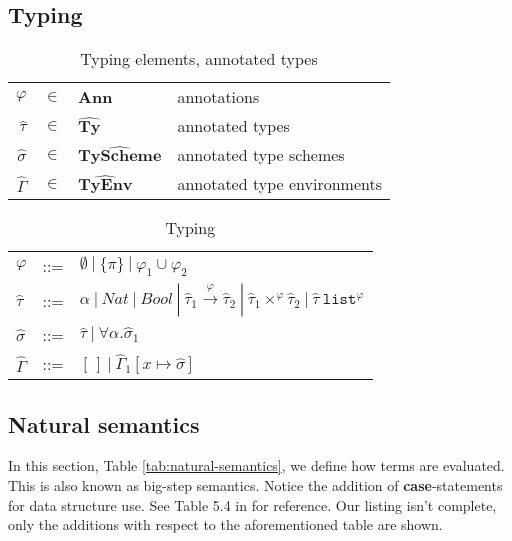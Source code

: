 \documentclass[a4paper]{article}
\begin{document}
\subsection{Typing}

\begin{table}
    \centering
    \begin{tabular}{rcll}
        $\varphi$ &               $\in$ & \textbf{Ann}                   & annotations \\ 
        $\widehat{\tau}$&         $\in$ & $\widehat{\textbf{Ty}      } $ & annotated types \\
        $\widehat{\sigma} $&      $\in$ & $\widehat{\textbf{TyScheme}} $ & annotated type schemes\\
        $\widehat{\Gamma}$&       $\in$ & $\widehat{\textbf{TyEnv}   } $ & annotated type environments  \\
    \end{tabular}
    \caption{Typing elements, annotated types}
    \label{tab:typingelems}
\end{table}
\begin{table}
    \centering
    \begin{tabular}{lcl}
        $ \varphi$         & ::= & $ \emptyset \:|\: \{\pi\} \:|\: \varphi_1 \cup \varphi_2 $ \\
        $\widehat{\tau}$   & ::= & $\alpha \:|\: Nat \: | \: Bool \: | \: \widehat{\tau}_1 \stackrel{\varphi}{\rightarrow} \widehat{\tau}_2 \:|\: \widehat{\tau}_1 \times^\varphi \widehat{\tau}_2 \:|\: \widehat{\tau}~\texttt{list}^\varphi   $ \\ 
        $\widehat{\sigma}$ & ::= & $\widehat{\tau} \:|\: \forall \alpha. \widehat{\sigma}_1 $ \\ 
        $\widehat{\Gamma}$ & ::= & $[\,] \:|\: \widehat{\Gamma}_1[x \mapsto \widehat{\sigma}] $ \\
    \end{tabular}
    \caption{Typing}
    \label{tab:typing}
\end{table}

\subsection{Natural semantics}

In this section, Table \ref{tab:natural-semantics}, we define how terms are
evaluated. This is also known as big-step semantics. Notice the addition of
\textbf{case}-statements for data structure use. See Table 5.4 in \cite{nnh}
for reference. Our listing isn't complete, only the additions with respect to the 
aforementioned table are shown. 
\end{document}
